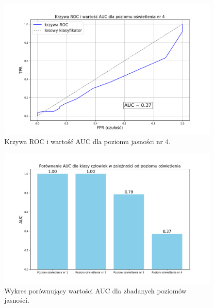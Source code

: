 \begin{figure}[H]
    \centering
    \includegraphics[width=\linewidth]{r_test_dokładności/AUC_charts/4.png}
    \caption{Krzywa ROC i wartość AUC dla poziomu jasności nr 4.}
    \label{fig:ROC-4}
\end{figure}

\begin{figure}[H]
    \centering
    \includegraphics[width=\linewidth]{r_test_dokładności/AUC_charts/porownanieAUC.png}
    \caption{Wykres porównujący wartości AUC dla zbadanych poziomów jasności.}
    \label{fig:AUC}
\end{figure}

